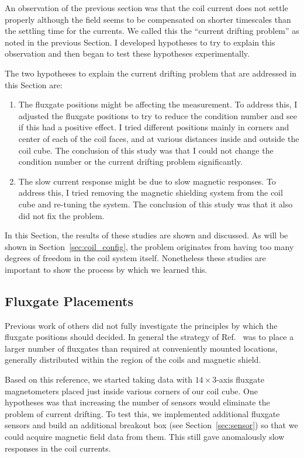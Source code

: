 An observation of the previous section was that the coil current does
not settle properly although the field seems to be compensated on
shorter timescales than the settling time for the currents.  We called
this the ``current drifting problem'' as noted in the previous
Section.  I developed hypotheses to try to explain this observation
and then began to test these hypotheses experimentally.

The two hypotheses to explain the current drifting problem that are
addressed in this Section are:
\begin{enumerate}
\item The fluxgate positions might be affecting the measurement.   To address this, I adjusted the fluxgate positions to try to reduce the condition number and see if this had a positive effect.  I tried different positions mainly in
corners and center of each of the coil faces, and at various distances
inside and outside the coil cube.  The conclusion of this study was
that I could not change the condition number or the current drifting
problem significantly.
\item The slow current response might be due to slow magnetic responses.
To address this, I tried removing the magnetic shielding system from
the coil cube and re-tuning the system.  The conclusion of this study
was that it also did not fix the problem.
\end{enumerate}
In this Section, the results of these studies are shown and discussed.
As will be shown in Section~\ref{sec:coil_config}, the problem
originates from having too many degrees of freedom in the coil system
itself.  Nonetheless these studies are important to show the process
by which we learned this.

\subsection{Fluxgate Placements}

Previous work of others did not fully investigate the principles by
which the fluxgate positions should decided.  In general the strategy
of Ref.~\cite{bea} was to place a larger number of
fluxgates than required at conveniently mounted locations, generally
distributed within the region of the coils and magnetic shield.

Based on this reference, we started taking data with $14\times 3$-axis fluxgate
magnetometers placed just inside various corners of our coil cube.
One hypotheses was that increasing the number of sensors would
eliminate the problem of current drifting. To test this, we
implemented additional fluxgate sensors and build an additional
breakout box (see Section~\ref{sec:sensor}) so that we could acquire
magnetic field data from them.  This still gave anomalously slow
responses in the coil currents.

